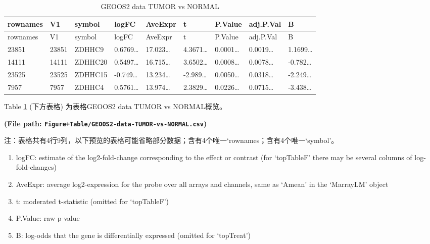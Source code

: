 \documentclass[
]{article}
\providecommand{\tightlist}{%
  \setlength{\itemsep}{0pt}\setlength{\parskip}{0pt}}
\begin{document}
\begin{center}\vspace{1.5cm}\end{center}

\begin{longtable}[]{@{}lllllllll@{}}
\caption{\label{tab:GEOOS2-data-TUMOR-vs-NORMAL}GEOOS2 data TUMOR vs NORMAL}\tabularnewline
\toprule
rownames & V1 & symbol & logFC & AveExpr & t & P.Value & adj.P.Val & B\tabularnewline
\midrule
\endfirsthead
\toprule
rownames & V1 & symbol & logFC & AveExpr & t & P.Value & adj.P.Val & B\tabularnewline
\midrule
\endhead
23851 & 23851 & ZDHHC9 & 0.6769\ldots{} & 17.023\ldots{} & 4.3671\ldots{} & 0.0001\ldots{} & 0.0019\ldots{} & 1.1699\ldots{}\tabularnewline
14111 & 14111 & ZDHHC20 & 0.5497\ldots{} & 16.715\ldots{} & 3.6502\ldots{} & 0.0008\ldots{} & 0.0078\ldots{} & -0.782\ldots{}\tabularnewline
23525 & 23525 & ZDHHC15 & -0.749\ldots{} & 13.234\ldots{} & -2.989\ldots{} & 0.0050\ldots{} & 0.0318\ldots{} & -2.249\ldots{}\tabularnewline
7957 & 7957 & ZDHHC4 & 0.5761\ldots{} & 13.974\ldots{} & 2.3829\ldots{} & 0.0226\ldots{} & 0.0715\ldots{} & -3.438\ldots{}\tabularnewline
\bottomrule
\end{longtable}

Table \ref{tab:GEOOS2-data-TUMOR-vs-NORMAL} (下方表格) 为表格GEOOS2 data TUMOR vs NORMAL概览。

\textbf{(File path: \texttt{Figure+Table/GEOOS2-data-TUMOR-vs-NORMAL.csv})}

\begin{center}\begin{tcolorbox}[colback=gray!10, colframe=gray!50, width=0.9\linewidth, arc=1mm, boxrule=0.5pt]注：表格共有4行9列，以下预览的表格可能省略部分数据；含有4个唯一`rownames；含有4个唯一`symbol'。
\end{tcolorbox}
\end{center}
\begin{center}\begin{tcolorbox}[colback=gray!10, colframe=gray!50, width=0.9\linewidth, arc=1mm, boxrule=0.5pt]\begin{enumerate}\tightlist
\item logFC:  estimate of the log2-fold-change corresponding to the effect or contrast (for ‘topTableF’ there may be several columns of log-fold-changes)
\item AveExpr:  average log2-expression for the probe over all arrays and channels, same as ‘Amean’ in the ‘MarrayLM’ object
\item t:  moderated t-statistic (omitted for ‘topTableF’)
\item P.Value:  raw p-value
\item B:  log-odds that the gene is differentially expressed (omitted for ‘topTreat’)
\end{enumerate}\end{tcolorbox}
\end{center}
\end{document}
